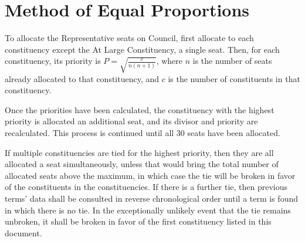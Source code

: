 \section{Method of Equal Proportions}
To allocate the Representative seats on Council, first allocate to each
constituency except the At Large Constituency, a single seat. Then, for each constituency, its priority is $P =
\sqrt{\frac{c}{n(n+1)}}$, where $n$ is the number of seats already allocated to
that constituency, and $c$ is the number of constituents in that constituency.

Once the priorities have been calculated, the constituency with the highest
priority is allocated an additional seat, and its divisor and priority are
recalculated. This process is continued until all 30 seats have been allocated.

If multiple constituencies are tied for the highest priority, then they are all
allocated a seat simultaneously, unless that would bring the total number of
allocated seats above the maximum, in which case the tie will be broken in favor
of the constituents in the constituencies. If there is a further tie, then
previous terms' data shall be consulted in reverse chronological order until a
term is found in which there is no tie. In the exceptionally unlikely event that
the tie remains unbroken, it shall be broken in favor of the first constituency
listed in this document.